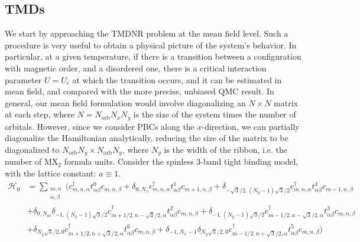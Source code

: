 \subsection{\acp{TMD}}
\label{subsec:apTMD}

We start by approaching the \acs{TMDNR} problem at the mean field level.
Such a procedure is very useful to obtain a physical picture of the system's behavior.
In particular, at a given temperature, if there is a transition between a configuration with magnetic order, and a disordered one, there is a critical interaction parameter $U = U_c$ at which the transition occurs, and it can be estimated in mean field, and compared with the more precise, unbiased \acs{QMC} result.
In general, our mean field formulation would involve diagonalizing an $N \times N$ matrix at each step, where $N = N_{\text{orb}} N_x N_y$ is the size of the system times the number of orbitals.
However, since we consider \acs{PBC}s along the $x$-direction, we can partially diagonalize  the Hamiltonian analytically, reducing the size of the matrix to be diagonalized to $N_{\text{orb}} N_y \times N_{\text{orb}} N_y$, where $N_y$ is the width of the ribbon, i.e. the number of $\text{M}\text{X}_2$ formula units.
Consider the spinless 3-band tight binding model, with the lattice constant: $a \equiv 1$.
\begin{equation}
\begin{split}
\mathcal{H}_0 &= \sum_{\substack{m, n \\ \alpha, \beta}} \bigg( c_{m,n, \alpha}^\dagger t_{\alpha\beta}^0 c_{m, n, \beta} + \delta_{0, N_x}  c_{m,n, \alpha}^\dagger t_{\alpha\beta}^1 c_{m+1, n, \beta} + \delta_{-\sqrt{3}/2, (N_y -1)\sqrt{3}/2}  c_{m,n, \alpha}^\dagger t_{\alpha\beta}^4 c_{m-1, n, \beta} \\
& + \delta_{0, N_m} \delta_{-1, (N_y -1)\sqrt{3}/2} c_{m+1/2,n-\sqrt{3}/2, \alpha}^\dagger t_{\alpha\beta}^2 c_{m, n, \beta} + \delta_{-1, (N_y -1)\sqrt{3}/2} c_{m-1/2,n-\sqrt{3}/2, \alpha}^\dagger t_{\alpha\beta}^3 c_{m, n, \beta} \\
& + \delta_{N_y\sqrt{3}/2, 0} c_{m+1/2,n+\sqrt{3}/2, \alpha}^\dagger t_{\alpha\beta}^6 c_{m, n, \beta} + \delta_{-1, N_x -1} \delta_{N_y\sqrt{3}/2, 0} c_{m-1/2,n+\sqrt{3}/2, \alpha}^\dagger t_{\alpha\beta}^5 c_{m, n, \beta} \bigg)
\end{split}
\end{equation}

